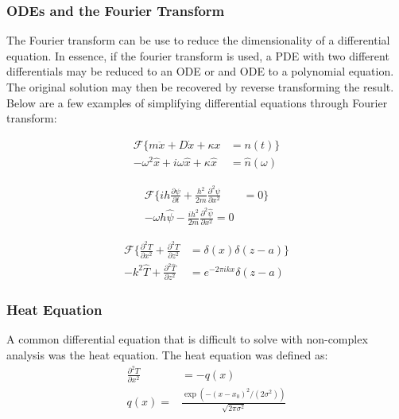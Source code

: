 \documentclass[twocolumn]{article}
\begin{document}
\subsubsection{ODEs and the Fourier Transform}
The Fourier transform can be use to reduce the dimensionality of a differential equation. In essence, if the fourier transform is used, a PDE with two different differentials may be reduced to an ODE or and ODE to a polynomial equation. The original solution may then be recovered by reverse transforming the result. Below are a few examples of simplifying differential equations through Fourier transform:

\begin{equation}
\begin{split}
\mathcal{F} \{ m\ddot{x} + D\dot{x} + \kappa x &= n(t) \} \\
-\omega^2 \hat{x} +i\omega \hat{x} + \kappa\hat{x} &= \hat{n}(\omega)
\end{split}
\end{equation}

\begin{equation}
\begin{split}
\mathcal{F} \{ih \frac{\partial \psi}{\partial t} + \frac{h^2}{2m} \frac{\partial^2 \psi}{\partial x^2} &= 0 \} \\
-\omega h \hat{\psi} - \frac{ih^2}{2m} \frac{\partial^2 \hat{\psi}}{\partial x^2} = 0
\end{split}
\end{equation}

\begin{equation}
\begin{split}
\mathcal{F} \{ \frac{\partial^2 T}{\partial x^2} + \frac{\partial^2 T}{\partial z^2} &= \delta (x) \delta (z - a) \}\\
-k^2 \hat{T} + \frac{\partial^2 \hat{T}}{\partial z^2} &= e^{-2\pi ik x} \delta (z - a)
\end{split}
\end{equation}

\subsubsection{Heat Equation}
A common differential equation that is difficult to solve with non-complex analysis was the heat equation. The heat equation was defined as:
\begin{equation}
\begin{split}
\frac{\partial^2 T}{\partial x^2} &= -q(x)\\
q(x) =& \frac{\exp(-(x-x_0)^2/(2\sigma^2))}{\sqrt{2\pi\sigma^2}}
\end{split}
\end{equation}
\end{document}

